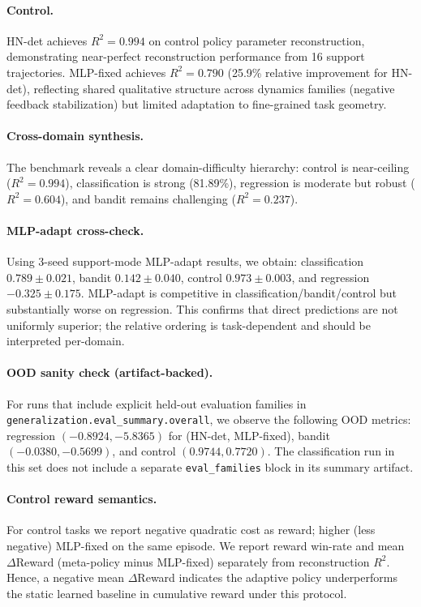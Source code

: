 \paragraph{Control.}
HN-det achieves $R^2 = 0.994$ on control policy parameter reconstruction,
demonstrating near-perfect reconstruction performance from 16 support trajectories.
MLP-fixed achieves $R^2 = 0.790$ (25.9\% relative improvement for HN-det),
reflecting shared qualitative structure across dynamics families (negative feedback stabilization)
but limited adaptation to fine-grained task geometry.

\paragraph{Cross-domain synthesis.}
The benchmark reveals a clear domain-difficulty hierarchy: control is near-ceiling
($R^2 = 0.994$), classification is strong (81.89\%), regression is moderate but robust
($R^2 = 0.604$), and bandit remains challenging ($R^2 = 0.237$).

\paragraph{MLP-adapt cross-check.}
Using 3-seed support-mode MLP-adapt results, we obtain: classification $0.789\pm0.021$,
bandit $0.142\pm0.040$, control $0.973\pm0.003$, and regression $-0.325\pm0.175$.
MLP-adapt is competitive in classification/bandit/control but substantially worse on regression.
This confirms that direct predictions are not uniformly superior; the relative ordering is
task-dependent and should be interpreted per-domain.

\paragraph{OOD sanity check (artifact-backed).}
For runs that include explicit held-out evaluation families in
\texttt{generalization.eval\_summary.overall}, we observe the following OOD metrics:
regression $(-0.8924, -5.8365)$ for (HN-det, MLP-fixed),
bandit $(-0.0380, -0.5699)$, and control $(0.9744, 0.7720)$.
The classification run in this set does not include a separate
\texttt{eval\_families} block in its summary artifact.

\paragraph{Control reward semantics.}
For control tasks we report negative quadratic cost as reward; higher (less negative)
MLP-fixed on the same episode. We report reward win-rate and mean $\Delta$Reward
(meta-policy minus MLP-fixed) separately from reconstruction $R^2$.
Hence, a negative mean $\Delta$Reward indicates the adaptive policy underperforms the
static learned baseline in cumulative reward under this protocol.

